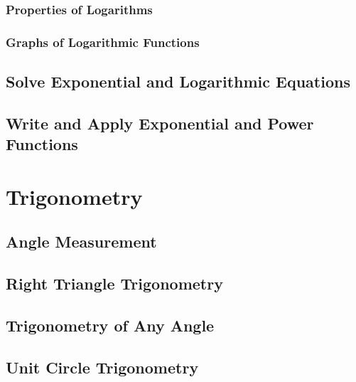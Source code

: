 \documentclass[]{book}
\begin{document}
\hypertarget{properties-of-logarithms}{%
\subsection{Properties of Logarithms}\label{properties-of-logarithms}}

\hypertarget{graphs-of-logarithmic-functions}{%
\subsection{Graphs of Logarithmic Functions}\label{graphs-of-logarithmic-functions}}

\hypertarget{solve-exponential-and-logarithmic-equations}{%
\section{Solve Exponential and Logarithmic Equations}\label{solve-exponential-and-logarithmic-equations}}

\hypertarget{write-and-apply-exponential-and-power-functions}{%
\section{Write and Apply Exponential and Power Functions}\label{write-and-apply-exponential-and-power-functions}}

\hypertarget{trigonometry}{%
\chapter{Trigonometry}\label{trigonometry}}

\hypertarget{angle-measurement}{%
\section{Angle Measurement}\label{angle-measurement}}

\hypertarget{right-triangle-trigonometry}{%
\section{Right Triangle Trigonometry}\label{right-triangle-trigonometry}}

\hypertarget{trigonometry-of-any-angle}{%
\section{Trigonometry of Any Angle}\label{trigonometry-of-any-angle}}

\hypertarget{unit-circle-trigonometry}{%
\section{Unit Circle Trigonometry}\label{unit-circle-trigonometry}}
\end{document}
